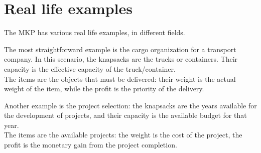 \section{Real life examples}
The MKP has various real life examples, in different fields.

The most straightforward example is the cargo organization for a transport company.
In this scenario, the knapsacks are the trucks or containers.
Their capacity is the effective capacity of the truck/container.\\
The items are the objects that must be delivered:
their weight is the actual weight of the item, while the profit is the priority of the delivery.

Another example is the project selection: the knapsacks are
the years available for the development of projects,
and their capacity is the available budget for that year.\\
The items are the available projects: the weight is the cost of the project, the profit is the monetary gain
from the project completion.
